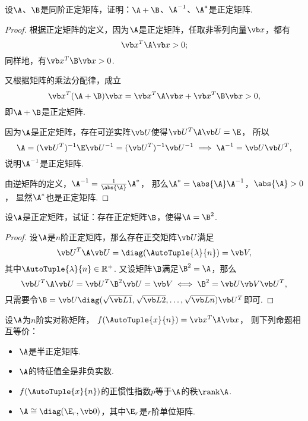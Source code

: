 \begin{example}
设\(\A\)、\(\B\)是同阶正定矩阵，证明：\(\A+\B\)、\(\A^{-1}\)、\(\A^*\)是正定矩阵.
\begin{proof}
根据正定矩阵的定义，因为\(\A\)是正定矩阵，任取非零列向量\(\x\)，都有\[
	\x^T\A\x > 0;
\]
同样地，有\(\x^T\B\x > 0\).

又根据矩阵的乘法分配律，成立\[
	\x^T(\A+\B)\x = \x^T\A\x + \x^T\B\x > 0,
\]
即\(\A+\B\)是正定矩阵.

因为\(\A\)是正定矩阵，存在可逆实阵\(\P\)使得\(\P^T\A\P=\E\)，
所以\[
	\A = (\P^T)^{-1}\E\P^{-1} = (\P^T)^{-1}\P^{-1}
	\implies
	\A^{-1} = \P\P^T,
\]
说明\(\A^{-1}\)是正定矩阵.

由逆矩阵的定义，\(\A^{-1}=\frac{1}{\abs{\A}}\A^*\)，
那么\(\A^*=\abs{\A}\A^{-1}\)，\(\abs{\A}>0\)，
显然\(\A^*\)也是正定矩阵.
\end{proof}
\end{example}

\begin{example}
设\(\A\)是正定矩阵，试证：存在正定矩阵\(\B\)，使得\(\A=\B^2\).
\begin{proof}
设\(\A\)是\(n\)阶正定矩阵，那么存在正交矩阵\(\P\)满足\[
	\P^T\A\P = \diag(\AutoTuple{\lambda}{n}) = \V,
\]
其中\(\AutoTuple{\lambda}{n} \in \mathbb{R}^+\).
又设矩阵\(\B\)满足\(\B^2=\A\)，那么\[
	\P^T\A\P = \P^T\B^2\P = \V
	\iff
	\B^2 = \P\V\P^T,
\]
只需要令\(\B = \P \diag(\sqrt{\L{1}},\sqrt{\L{2}},\dotsc,\sqrt{\L{n}}) \P^T\)即可.
\end{proof}
\end{example}

\begin{theorem}
设\(\A\)为\(n\)阶实对称矩阵，
\(f(\AutoTuple{x}{n}) = \x^T\A\x\)，
则下列命题相互等价：\begin{itemize}
	\item \(\A\)是半正定矩阵.
	\item \(\A\)的特征值全是非负实数.
	\item \(f(\AutoTuple{x}{n})\)的正惯性指数\(p\)等于\(\A\)的秩\(\rank\A\).
	\item \(\A \cong \diag(\E_r,\vb0)\)，其中\(\E_r\)是\(r\)阶单位矩阵.
\end{itemize}
\end{theorem}
